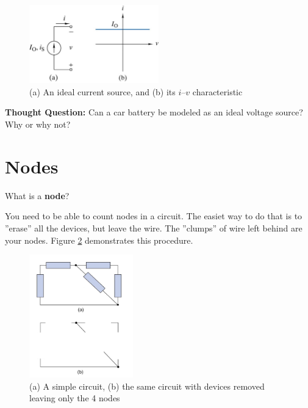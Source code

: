 \documentclass{handout}
\begin{document}
\begin{figure}[h b t]
\centering
\includegraphics[width=0.5\textwidth]{Ideal_Current_Source.jpg}
\caption{(a) An ideal current source, and  (b) its $i$--$v$ characteristic}
\label{fig: Ideal_Current_Source}
\end{figure}

\textbf{Thought Question:} Can a car battery be modeled as an ideal voltage source? Why or why not?


\newpage

\section{Nodes}

What is a \textbf{node}?


You need to be able to count nodes in a circuit.  The easiet way to do that is to ''erase'' all the devices, but leave the wire.  The ''clumps'' of wire left behind are your nodes. Figure \ref{fig: CountingNodes} demonstrates this procedure.

\begin{figure}[h b t]
\centering
\includegraphics[width=0.4\textwidth]{CountingNodes.jpg}
\caption{(a) A simple circuit,  (b) the same circuit with devices removed leaving only the 4 nodes}
\label{fig: CountingNodes}
\end{figure}
\end{document}
